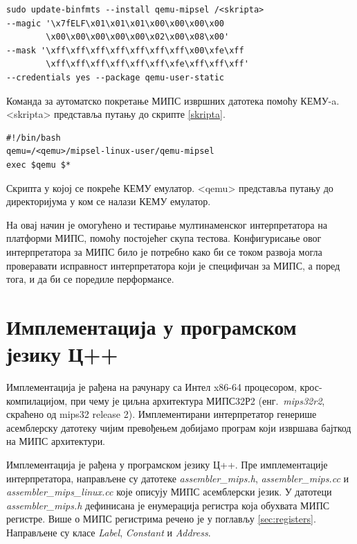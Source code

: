 \documentclass[12pt,oneside]{memoir}
\begin{document}
\begin{listing}
\centering
\begin{verbatim}
sudo update-binfmts --install qemu-mipsel /<skripta>
--magic '\x7fELF\x01\x01\x01\x00\x00\x00\x00
        \x00\x00\x00\x00\x00\x02\x00\x08\x00'
--mask '\xff\xff\xff\xff\xff\xff\xff\x00\xfe\xff
        \xff\xff\xff\xff\xff\xff\xfe\xff\xff\xff'
--credentials yes --package qemu-user-static
\end{verbatim}
\caption{Команда за аутоматско покретање МИПС извршних датотека помоћу КЕМУ-a. <skripta> представља путању до скрипте \ref{skripta}.}
\label{qemu_komanda}
\end{listing}


\begin{listing}
\centering
\begin{verbatim}
#!/bin/bash
qemu=/<qemu>/mipsel-linux-user/qemu-mipsel
exec $qemu $*
\end{verbatim}
\caption{Скрипта у којој се покреће КЕМУ емулатор. <qemu> представља путању до директоријума у ком се налази КЕМУ емулатор.}
\label{skripta}
\end{listing}

На овај начин је омогућено и тестирање мултинаменског интерпретатора на платформи МИПС, помоћу постојећег скупа тестова. Конфигурисање овог интерпретатора за МИПС било је потребно како би се током развоја могла проверавати исправност интерпретатора који је специфичан за МИПС, а поред тога, и да би се поредиле перформансе.

\section{Имплементација у програмском језику Ц++}
\label{implementacijacpp}
Имплементација је рађена на рачунару са Интел x86-64 процесором, крос-компилацијом, при чему је циљна архитектура  МИПС32Р2 (енг.~\textit{mips32r2}, скраћено од mips32 release 2). Имплементирани интерпретатор генерише асемблерску датотеку чијим превођењем добијамо програм који извршава бајткод на МИПС архитектури.

Имплементација је рађена у програмском језику Ц++. Пре имплементације интерпретатора, направљене су датотеке \textit{assembler\_mips.h},  \textit{assembler\_mips.cc} и \textit{assembler\_mips\_linux.cc} које описују МИПС асемблерски језик. У датотеци \textit{assembler\_mips.h} дефинисана је енумерација регистра која обухвата МИПС регистре. Више о МИПС регистрима речено је у поглављу \ref{sec:registers}. Направљене су класе \textit{Label}, \textit{Constant} и \textit{Address}. 
\end{document}
